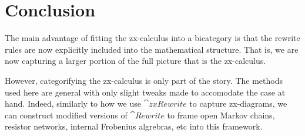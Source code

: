 \documentclass[./1--Catfying_zxCalc--Master.tex]{subfiles} %
\begin{document}
%

\section{Conclusion}
\label{sec:Conclusion}

The main advantage of 
fitting the zx-calculus 
into a bicategory is that 
the rewrite rules are now 
explicitly included
into the mathematical structure.
That is, we are now capturing
a larger portion
of the full picture that is
the zx-calculus. 

However, categorifying the
zx-calculus is only
part of the story.
The methods used here
are general
with only slight tweaks
made to accomodate the
case at hand.  
Indeed, similarly to how
we use $\cat{zxRewrite}$
to capture zx-diagrams,
we can construct modified versions
of $\cat{Rewrite}$ to frame 
open Markov chains, resistor networks,
internal Frobenius algrebras, etc
into this framework. 

% 
\end{document}
